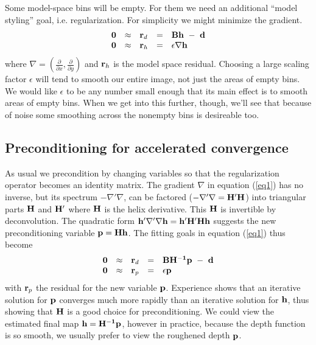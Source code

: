 \par

Some model-space bins will be empty.
For them we need an additional ``model styling'' goal,
i.e. regularization.
For simplicity we might minimize the gradient.
\begin{equation}
  \begin{array}{lllll}
    \bold 0 &\approx& \bold r_d &=& \bold B \bold h \ -\  \bold d \\
    \bold 0 &\approx& \bold r_h &=& \epsilon \nabla \bold h 
  \end{array} \label{eq1}
\end{equation}
where $\nabla=\left ( \frac{\partial}{\partial x},
\frac{\partial}{\partial y}\right)$ and $\bold r_h$ is the model space
residual.
Choosing a large scaling factor $\epsilon$ will tend to smooth
our entire image, not just the areas of empty bins.
We would like $\epsilon$ to be any number small enough
that its main effect is to smooth areas of empty bins.
When we get into this further, though, we'll see that
because of noise
some smoothing across the nonempty bins is desireable too.


\subsection{Preconditioning for accelerated convergence}

As usual we
precondition by changing variables so
that the regularization operator becomes an identity matrix.
The gradient $\nabla$ in equation (\ref{eq1}) has no inverse, but its
spectrum $-\nabla'\nabla$,
can be factored ($-\nabla'\nabla={\bf H'H}$) into triangular parts 
${\bf H}$ and ${\bf H'}$ where ${\bf H}$ is the helix derivative.
This ${\bf H}$ is invertible by deconvolution.
The quadratic form
$\bold h'\nabla'\nabla\bold h = \bold h'\bold H'\bold H \bold h$
suggests the new preconditioning variable $\bold p = \bold H\bold h$.
The fitting goals in equation (\ref{eq1}) thus become
\begin{equation}
  \begin{array}{lllll}
    \bold 0 &\approx& \bold r_d &=& \bold B \bold {H^{-1}} \bold p \ -\  \bold d \\
    \bold 0 &\approx& \bold r_p &=& \epsilon \bold p
  \end{array} \label{eq2}
\end{equation}
with $\bold r_p$ the residual for the new variable ${\bf p}$.
Experience shows that an iterative solution for ${\bf p}$ converges much
more rapidly than an iterative solution for ${\bf h}$,
thus showing that ${\bf H}$ is a good choice for preconditioning. 
We could view the estimated final map ${\bf h}={\bf H^{-1}p}$,
however in practice, because the depth function is so smooth,
we usually prefer to view the roughened depth $\bold p$.


